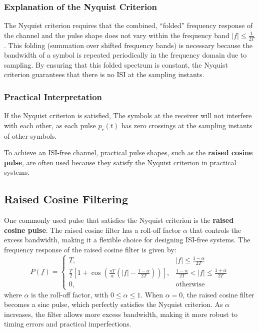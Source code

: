 \documentclass[10pt]{article}
\begin{document}
\subsubsection{Explanation of the Nyquist Criterion}
The Nyquist criterion requires that the combined, ``folded'' frequency response of the channel and the pulse shape does not vary within the frequency band \( |f| \le \frac{1}{2T} \). This folding (summation over shifted frequency bands) is necessary because the bandwidth of a symbol is repeated periodically in the frequency domain due to sampling. By ensuring that this folded spectrum is constant, the Nyquist criterion guarantees that there is no ISI at the sampling instants.

\subsubsection{Practical Interpretation}
If the Nyquist criterion is satisfied, The symbols at the receiver will not interfere with each other, as each pulse \( p_r(t) \) has zero crossings at the sampling instants of other symbols.

To achieve an ISI-free channel, practical pulse shapes, such as the \textbf{raised cosine pulse}, are often used because they satisfy the Nyquist criterion in practical systems.

\subsection{Raised Cosine Filtering}
One commonly used pulse that satisfies the Nyquist criterion is the \textbf{raised cosine pulse}. The raised cosine filter has a roll-off factor \( \alpha \) that controls the excess bandwidth, making it a flexible choice for designing ISI-free systems. The frequency response of the raised cosine filter is given by:
\[
P(f) =
\begin{cases}
T, & |f| \le \frac{1 - \alpha}{2T} \\
\frac{T}{2} \left[ 1 + \cos\left( \frac{\pi T}{\alpha} \left( |f| - \frac{1 - \alpha}{2T} \right) \right) \right], & \frac{1 - \alpha}{2T} < |f| \le \frac{1 + \alpha}{2T} \\
0, & \text{otherwise}
\end{cases}
\]
where \( \alpha \) is the roll-off factor, with \( 0 \leq \alpha \leq 1 \). When \( \alpha = 0 \), the raised cosine filter becomes a sinc pulse, which perfectly satisfies the Nyquist criterion. As \( \alpha \) increases, the filter allows more excess bandwidth, making it more robust to timing errors and practical imperfections.
\end{document}

